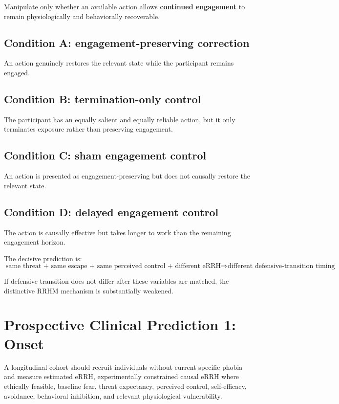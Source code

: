 \documentclass[11pt]{article}
\begin{document}
Manipulate only whether an available action allows \textbf{continued engagement} to remain physiologically and behaviorally recoverable.

\subsection*{Condition A: engagement-preserving correction}
An action genuinely restores the relevant state while the participant remains engaged.

\subsection*{Condition B: termination-only control}
The participant has an equally salient and equally reliable action, but it only terminates exposure rather than preserving engagement.

\subsection*{Condition C: sham engagement control}
An action is presented as engagement-preserving but does not causally restore the relevant state.

\subsection*{Condition D: delayed engagement control}
The action is causally effective but takes longer to work than the remaining engagement horizon.

The decisive prediction is:
\[
\boxed{
\text{same threat + same escape + same perceived control + different eRRH}
\Rightarrow
\text{different defensive-transition timing}
}
\]

If defensive transition does not differ after these variables are matched, the distinctive RRHM mechanism is substantially weakened.

\section{Prospective Clinical Prediction 1: Onset}

A longitudinal cohort should recruit individuals without current specific phobia and measure estimated eRRH, experimentally constrained causal eRRH where ethically feasible, baseline fear, threat expectancy, perceived control, self-efficacy, avoidance, behavioral inhibition, and relevant physiological vulnerability.
\end{document}
